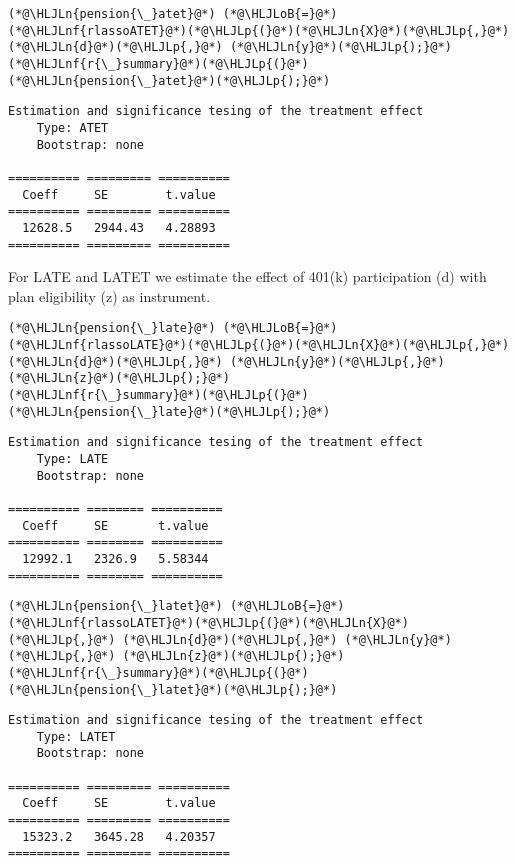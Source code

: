 \documentclass[12pt,a4paper]{article}
\newcommand{\HLJLn}[1]{#1}
\newcommand{\HLJLnf}[1]{\textcolor[RGB]{66,102,213}{#1}}
\newcommand{\HLJLoB}[1]{\textcolor[RGB]{102,102,102}{\textbf{#1}}}
\newcommand{\HLJLp}[1]{#1}
\begin{document}
\begin{lstlisting}
(*@\HLJLn{pension{\_}atet}@*) (*@\HLJLoB{=}@*) (*@\HLJLnf{rlassoATET}@*)(*@\HLJLp{(}@*)(*@\HLJLn{X}@*)(*@\HLJLp{,}@*) (*@\HLJLn{d}@*)(*@\HLJLp{,}@*) (*@\HLJLn{y}@*)(*@\HLJLp{);}@*)
(*@\HLJLnf{r{\_}summary}@*)(*@\HLJLp{(}@*)(*@\HLJLn{pension{\_}atet}@*)(*@\HLJLp{);}@*)
\end{lstlisting}

\begin{lstlisting}
Estimation and significance tesing of the treatment effect
    Type: ATET
    Bootstrap: none
    
========== ========= ==========
  Coeff     SE        t.value
========== ========= ==========
  12628.5   2944.43   4.28893
========== ========= ==========
\end{lstlisting}


For LATE and LATET we estimate the effect of 401(k) participation (d) with plan eligibility (z) as instrument.


\begin{lstlisting}
(*@\HLJLn{pension{\_}late}@*) (*@\HLJLoB{=}@*) (*@\HLJLnf{rlassoLATE}@*)(*@\HLJLp{(}@*)(*@\HLJLn{X}@*)(*@\HLJLp{,}@*) (*@\HLJLn{d}@*)(*@\HLJLp{,}@*) (*@\HLJLn{y}@*)(*@\HLJLp{,}@*) (*@\HLJLn{z}@*)(*@\HLJLp{);}@*)
(*@\HLJLnf{r{\_}summary}@*)(*@\HLJLp{(}@*)(*@\HLJLn{pension{\_}late}@*)(*@\HLJLp{);}@*)
\end{lstlisting}

\begin{lstlisting}
Estimation and significance tesing of the treatment effect
    Type: LATE
    Bootstrap: none
    
========== ======== ==========
  Coeff     SE       t.value
========== ======== ==========
  12992.1   2326.9   5.58344
========== ======== ==========
\end{lstlisting}


\begin{lstlisting}
(*@\HLJLn{pension{\_}latet}@*) (*@\HLJLoB{=}@*) (*@\HLJLnf{rlassoLATET}@*)(*@\HLJLp{(}@*)(*@\HLJLn{X}@*)(*@\HLJLp{,}@*) (*@\HLJLn{d}@*)(*@\HLJLp{,}@*) (*@\HLJLn{y}@*)(*@\HLJLp{,}@*) (*@\HLJLn{z}@*)(*@\HLJLp{);}@*)
(*@\HLJLnf{r{\_}summary}@*)(*@\HLJLp{(}@*)(*@\HLJLn{pension{\_}latet}@*)(*@\HLJLp{);}@*)
\end{lstlisting}

\begin{lstlisting}
Estimation and significance tesing of the treatment effect
    Type: LATET
    Bootstrap: none
    
========== ========= ==========
  Coeff     SE        t.value
========== ========= ==========
  15323.2   3645.28   4.20357
========== ========= ==========
\end{lstlisting}
\end{document}
